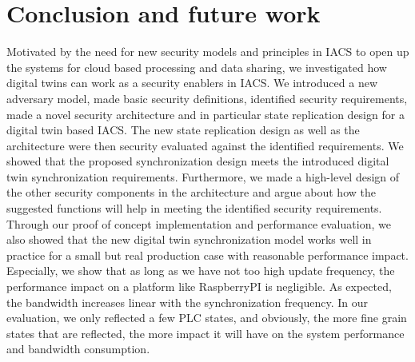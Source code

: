 \section{Conclusion and future work}
\label{sec:digital-twin:conclusion}
Motivated by the need for new security models and principles in IACS to open up the systems for cloud based processing and data sharing, we investigated how digital twins can work as a security enablers in IACS. We introduced a new adversary model, made basic security definitions, identified security requirements, made a novel security architecture and in particular state replication design for a digital twin based IACS. The new state replication design as well as the architecture were then security evaluated against the identified requirements. We showed that the proposed synchronization design meets the introduced digital twin synchronization requirements. Furthermore, we made a high-level design of the other security components in the architecture and argue about how the suggested functions will help in meeting the identified security requirements.  Through our proof of concept implementation and performance evaluation, we also showed that the new digital twin synchronization model works well in practice for a small but real production case with reasonable performance impact. Especially, we show that as long as we have not too high update frequency, the performance impact on a platform like RaspberryPI is negligible. As expected, the bandwidth increases linear with the synchronization frequency. In our evaluation, we only reflected a few PLC states, and obviously, the more fine grain states that are reflected, the more impact it will have on the system performance and bandwidth consumption.

